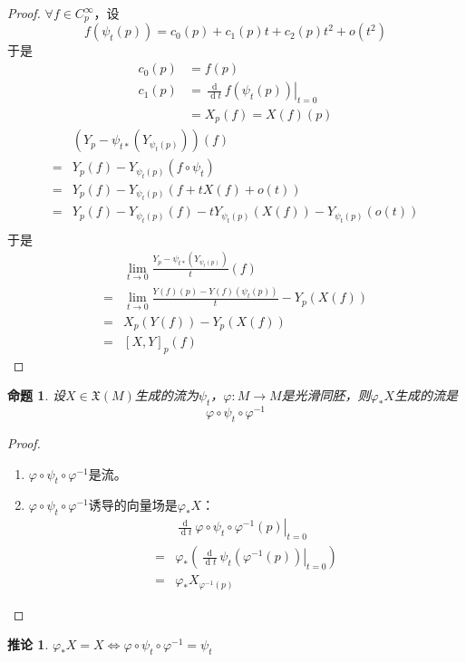 \documentclass[winfonts,UTF8,c5size,a4paper,fancyhdr,hyperref,titlepage,nocap]{ctexart}
\newtheorem{cor}[thm]{推论}
\newtheorem{prop}[thm]{命题}
\theoremstyle{definition}
\theoremstyle{remark}
\numberwithin{equation}{subsection}
\newcommand{\dt}{\frac{\operatorname{d}}{\operatorname{d}t}}
\newcommand{\Xf}[1]{\mathfrak{X}(#1)}
\newcommand{\local}[2]{\left.{#1}\right|_{#2}}%
\newcommand{\localt}[1]{\local{#1}{t=0}}%
\begin{document}
\begin{proof}
  $\forall f\in C^{\infty}_p$，设
\begin{equation*}
f(\psi_t(p))=c_0(p)+c_1(p)t+c_2(p)t^2+o(t^2)
\end{equation*}
于是
\begin{align*}
c_0(p)&=f(p)\\
c_1(p)&=\localt{\dt f(\psi_t(p))}\\
      &=X_p(f)=X(f)(p)
\end{align*}
\begin{align*}
  &(Y_p-\psi_{t\ast}(Y_{\psi_t(p)}))(f)\\
=&Y_p(f)-Y_{\psi_t(p)}(f\circ\psi_t)\\
=&Y_p(f)-Y_{\psi_t(p)}(f+tX(f)+o(t))\\
=&Y_p(f)-Y_{\psi_t(p)}(f)-tY_{\psi_t(p)}(X(f))-Y_{\psi_t(p)}(o(t))\\
\end{align*}
于是
\begin{align*}
  &\lim_{t\to0}\frac{Y_p-\psi_{t\ast}(Y_{\psi_t(p)})}{t}(f)\\
=&\lim_{t\to0}\frac{Y(f)(p)-Y(f)(\psi_t(p))}{t}-Y_p(X(f))\\
=&X_p(Y(f))-Y_p(X(f))\\
=&[X,Y]_p(f)
\end{align*}
\end{proof}
\begin{prop}
设$X\in\Xf{M}$生成的流为$\psi_t$，$\varphi\colon M\to M$是光滑同胚，则$\varphi_{\ast}X$生成的流是
\begin{equation*}
  \varphi\circ\psi_t\circ\varphi^{-1}
\end{equation*}
\end{prop}
\begin{proof}
\begin{enumerate}[1)]
    \setlength{\itemindent}{2ex}
    \item $\varphi\circ\psi_t\circ\varphi^{-1}$是流。
    \item $\varphi\circ\psi_t\circ\varphi^{-1}$诱导的向量场是$\varphi_{\ast}X$：
  \begin{align*}
     &\localt{\dt\varphi\circ\psi_t\circ\varphi^{-1}(p)}\\
  =&\varphi_{\ast}(\localt{\dt\psi_t(\varphi^{-1}(p))})\\
  =&\varphi_{\ast}X_{\varphi^{-1}(p)}
  \end{align*}
\end{enumerate}
\end{proof}
\begin{cor}
  $\varphi_{\ast}X=X\Longleftrightarrow\varphi\circ\psi_t\circ\varphi^{-1}=\psi_t$
\end{cor}
\end{document}
